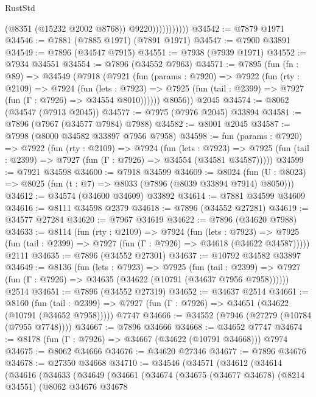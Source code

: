 \begin{lexlean}{RustStd}
\begin{coremodule}
                          (@8351 (@15232 @2002 @8768))
                          @9220)))))))))))
@34542 := @7879 @1971
@34546 := @7881 (@7885 @1971) (@7891 @1971)
@34547 := @7900 @33891
@34549 := @7896 (@34547 @7915)
@34551 := @7938 (@7939 @1971)
@34552 := @7934 @34551
@34554 := @7896 (@34552 @7963)
@34571 := @7895
    (fun (fn : @89) =>
    @34549
      (@7918
        (@7921
          (fun (params : @7920) =>
          @7922
            (fun (rty : @2109) =>
            @7924
              (fun (lets : @7923) =>
              @7925 (fun (tail : @2399) => @7927 (fun (Γ : @7926) => @34554 @8010))))))
        @8056))
    @2045
@34574 := @8062 (@34547 (@7913 @2045))
@34577 := @7975 (@7976 @2045) @33894
@34581 := @7896 (@7967 (@34577 @7984) @7988)
@34582 := @8001 @2045
@34587 := @7998 (@8000 @34582 @33897 @7956 @7958)
@34598 := fun (params : @7920) =>
  @7922
    (fun (rty : @2109) =>
    @7924
      (fun (lets : @7923) =>
      @7925 (fun (tail : @2399) => @7927 (fun (Γ : @7926) => @34554 (@34581 @34587)))))
@34599 := @7921 @34598
@34600 := @7918 @34599
@34609 := @8024
    (fun (U : @8023) => @8025 (fun (t : @7) => @8033 (@7896 (@8039 @33894 @7914) @8050)))
@34612 := @34574 (@34600 @34609) @33892
@34614 := @7881 @34599 @34609
@34616 := @8111 @34598 @2379
@34618 := @7896 (@34552 @27281)
@34619 := @34577 @27284
@34620 := @7967 @34619
@34622 := @7896 (@34620 @7988)
@34633 := @8114
    (fun (rty : @2109) =>
    @7924
      (fun (lets : @7923) =>
      @7925 (fun (tail : @2399) => @7927 (fun (Γ : @7926) => @34618 (@34622 @34587)))))
    @2111
@34635 := @7896 (@34552 @27301)
@34637 := @10792 @34582 @33897
@34649 := @8136
    (fun (lets : @7923) =>
    @7925
      (fun (tail : @2399) =>
      @7927 (fun (Γ : @7926) => @34635 (@34622 (@10791 (@34637 @7956 @7958))))))
    @2514
@34651 := @7896 (@34552 @27319)
@34652 := @34637 @2514
@34661 := @8160
    (fun (tail : @2399) => @7927 (fun (Γ : @7926) => @34651 (@34622 (@10791 (@34652 @7958)))))
    @7747
@34666 := @34552 (@7946 (@27279 (@10784 (@7955 @7748))))
@34667 := @7896 @34666
@34668 := @34652 @7747
@34674 := @8178 (fun (Γ : @7926) => @34667 (@34622 (@10791 @34668))) @7974
@34675 := @8062 @34666
@34676 := @34620 @27346
@34677 := @7896 @34676
@34678 := @27350 @34668
@34710 := @34546
    (@34571
      (@34612
        (@34614
          (@34616
            (@34633
              (@34649
                (@34661
                  (@34674
                    (@34675
                      (@34677 @34678)
                      (@8214 @34551)
                      (@8062
                        @34676
                        @34678

\end{coremodule}
\end{lexlean}
